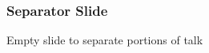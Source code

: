 \begin{frame}
\frametitle{Separator Slide}

    Empty slide to separate portions of talk

\end{frame}



